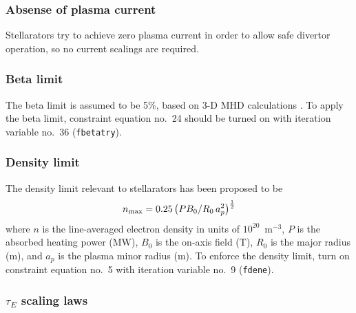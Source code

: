 \documentclass[11pt,a4paper]{report}
\begin{document}
\subsubsection{Absense of plasma current}

Stellarators try to achieve zero plasma current in order to allow safe
divertor operation, so no current scalings are required.

\subsubsection{Beta limit}

The beta limit is assumed to be 5\%, based on 3-D MHD calculations
\cite{Nuhrenberg}. To apply the beta limit, constraint equation no.\ 24 should
be turned on with iteration variable no.\ 36 (\texttt{fbetatry}).

\subsubsection{Density limit}

The density limit relevant to stellarators has been proposed to be~\cite{LHD}
\begin{equation}
n_{\mbox{\scriptsize max}} = 0.25\left( P B_0 / R_0 \, a_p^2\right)^\frac{1}{2}
\end{equation}
where $n$ is the line-averaged electron density in units of
$10^{20}$~m$^{-3}$, $P$ is the absorbed heating power (MW), $B_0$ is the
on-axis field (T), $R_0$ is the major radius (m), and $a_p$ is the plasma
minor radius (m). To enforce the density limit, turn on constraint equation
no.\ 5 with iteration variable no.\ 9 (\texttt{fdene}).

\subsubsection{$\tau_E$ scaling laws}

\end{document}
